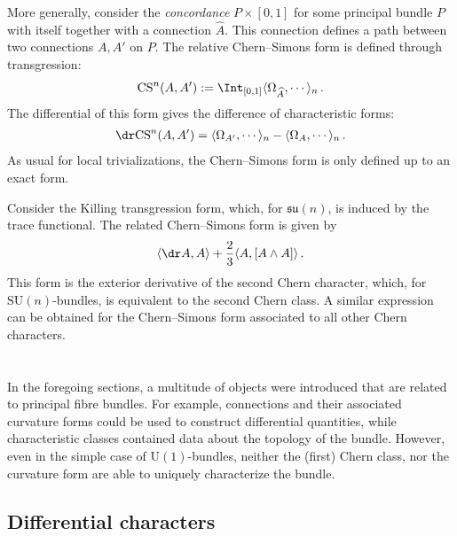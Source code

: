     More generally, consider the \textit{concordance} $P\times[0,1]$ for some principal bundle $P$ with itself together with a connection $\widehat{A}$. This connection defines a path between two connections $A,A'$ on $P$. The relative Chern--Simons form is defined through transgression:
    \begin{gather}
        \mathrm{CS}^n(A,A') := \Int_{[0,1]}\langle\Omega_{\widehat{A}},\cdots\rangle_n\,.
    \end{gather}
    The differential of this form gives the difference of characteristic forms:
    \begin{gather}
        \dr\mathrm{CS}^n(A,A') = \langle\Omega_{A'},\cdots\rangle_n - \langle\Omega_A,\cdots\rangle_n\,.
    \end{gather}
    As usual for local trivializations, the Chern--Simons form is only defined up to an exact form.

    \begin{example}
        Consider the Killing transgression form, which, for $\mathfrak{su}(n)$, is induced by the trace functional. The related Chern--Simons form is given by
        \begin{gather}
            \langle\dr A,A\rangle + \frac{2}{3}\langle A,[A\wedge A] \rangle\,.
        \end{gather}
        This form is the exterior derivative of the second Chern character, which, for $\mathrm{SU}(n)$-bundles, is equivalent to the second Chern class. A similar expression can be obtained for the Chern--Simons form associated to all other Chern characters.
    \end{example}

\section{}\label{section:differential_cohomology}

    In the foregoing sections, a multitude of objects were introduced that are related to principal fibre bundles. For example, connections and their associated curvature forms could be used to construct differential quantities, while characteristic classes contained data about the topology of the bundle. However, even in the simple case of $\mathrm{U}(1)$-bundles, neither the (first) Chern class, nor the curvature form are able to uniquely characterize the bundle.

\subsection{Differential characters}

